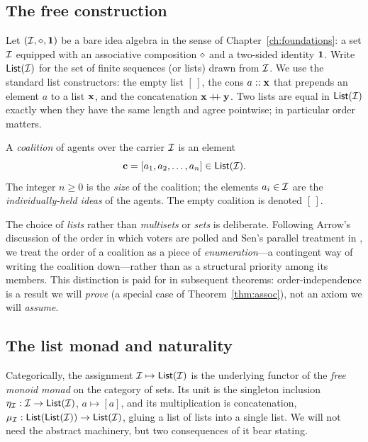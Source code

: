 \subsection*{The free construction}

Let $(\mathcal{I},\mathbin{\diamond},\mathbf{1})$ be a bare idea algebra in the sense of
Chapter~\ref{ch:foundations}: a set $\mathcal{I}$ equipped with an
associative composition $\mathbin{\diamond}$ and a two-sided identity $\mathbf{1}$.
Write $\mathsf{List}(\mathcal{I})$ for the set of finite sequences (or lists)
drawn from $\mathcal{I}$. We use the standard list constructors: the empty
list $[\,]$, the cons $a :: \mathbf{x}$ that prepends an element $a$ to a
list $\mathbf{x}$, and the concatenation $\mathbf{x} \mathbin{+\!\!+} \mathbf{y}$. Two lists are
equal in $\mathsf{List}(\mathcal{I})$ exactly when they have the same length and
agree pointwise; in particular order matters.

\begin{definition}[Coalition]\label{def:coalition}
A \emph{coalition} of agents over the carrier $\mathcal{I}$ is an element
\[
  \mathbf{c} = [a_1, a_2, \ldots, a_n] \in \mathsf{List}(\mathcal{I}).
\]
The integer $n \geq 0$ is the \emph{size} of the coalition; the
elements $a_i \in \mathcal{I}$ are the \emph{individually-held ideas} of
the agents. The empty coalition is denoted $[\,]$.
\end{definition}

The choice of \emph{lists} rather than \emph{multisets} or \emph{sets}
is deliberate. Following Arrow's discussion of the order in which
voters are polled \cite{Arrow1951} and Sen's parallel treatment in
\cite{Sen1970}, we treat the order of a coalition as a piece of
\emph{enumeration}---a contingent way of writing the coalition
down---rather than as a structural priority among its members. This
distinction is paid for in subsequent theorems: order-independence is
a result we will \emph{prove} (a special case of Theorem~\ref{thm:assoc}),
not an axiom we will \emph{assume}.

\subsection*{The list monad and naturality}

Categorically, the assignment $\mathcal{I} \mapsto \mathsf{List}(\mathcal{I})$ is the
underlying functor of the \emph{free monoid monad} on the category of
sets. Its unit is the singleton inclusion
$\eta_{\mathcal{I}} : \mathcal{I} \to \mathsf{List}(\mathcal{I})$, $a \mapsto [a]$, and its
multiplication is concatenation,
$\mu_{\mathcal{I}} : \mathsf{List}(\mathsf{List}(\mathcal{I})) \to \mathsf{List}(\mathcal{I})$, gluing a list
of lists into a single list. We will not need the abstract
machinery, but two consequences of it bear stating.

